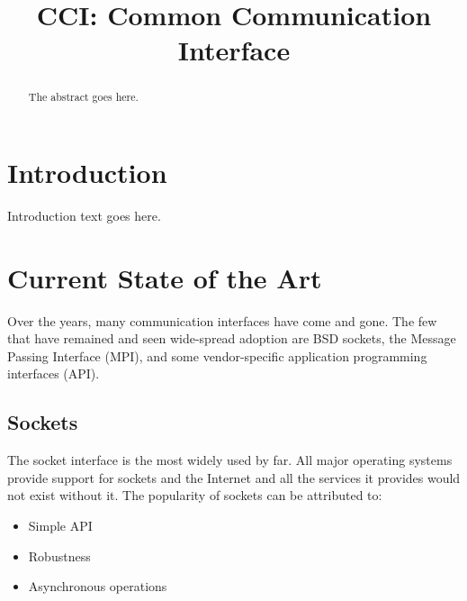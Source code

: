 \documentclass[conference]{IEEEtran}
\begin{document}
%
\title{CCI: Common Communication Interface}
% 
\author{
}

\maketitle

\begin{abstract}
The abstract goes here.

\end{abstract}


\IEEEpeerreviewmaketitle

\section{Introduction}
Introduction text goes here.

\section{Current State of the Art}
Over the years, many communication interfaces have come and gone. The few that have
remained and seen wide-spread adoption are BSD sockets\cite{BSD}, the Message Passing
Interface (MPI)\cite{MPI}, and some vendor-specific application programming interfaces
(API).

\subsection{Sockets} The socket interface is the most widely used by far. All major
operating systems provide support for sockets and the Internet and all the services it
provides would not exist without it. The popularity of sockets can be attributed to:

\begin{itemize}
\item Simple API
\item Robustness
\item Asynchronous operations
\end{itemize}
\end{document}
